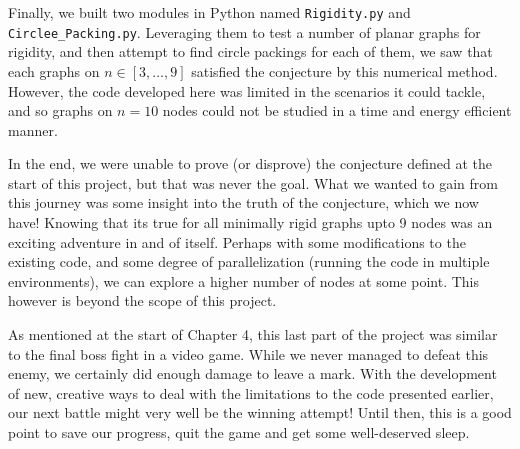 \begin{flushleft}
Finally, we built two modules in Python named \texttt{Rigidity.py} and \texttt{Circlee\_Packing.py}. Leveraging them to test a number of planar graphs for rigidity, and then attempt to find circle packings for each of them, we saw that each graphs on $n \in [3, \hdots, 9]$ satisfied the conjecture by this numerical method. However, the code developed here was limited in the scenarios it could tackle, and so graphs on $n = 10$ nodes could not be studied in a time and energy efficient manner. 
\end{flushleft}

\begin{flushleft}
In the end, we were unable to prove (or disprove) the conjecture defined at the start of this project, but that was never the goal. What we wanted to gain from this journey was some insight into the truth of the conjecture, which we now have! Knowing that its true for all minimally rigid graphs upto 9 nodes was an exciting adventure in and of itself. Perhaps with some modifications to the existing code, and some degree of parallelization (running the code in multiple environments), we can explore a higher number of nodes at some point. This however is beyond the scope of this project.
\end{flushleft}

\begin{flushleft}
As mentioned at the start of Chapter 4, this last part of the project was similar to the final boss fight in a video game. While we never managed to defeat this enemy, we certainly did enough damage to leave a mark. With the development of new, creative ways to deal with the limitations to the code presented earlier, our next battle might very well be the winning attempt! Until then, this is a good point to save our progress, quit the game and get some well-deserved sleep. 
\end{flushleft}